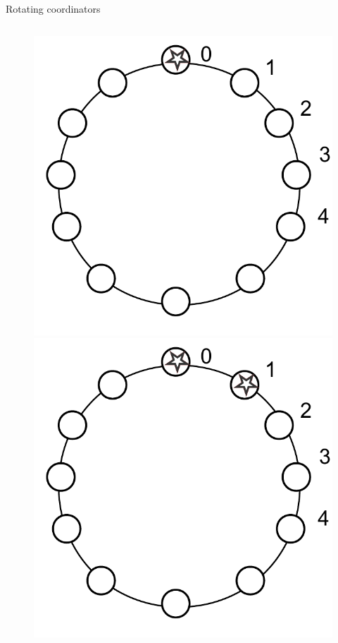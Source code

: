 \begin{frame}{Rotating coordinators}
\begin{columns}
\begin{column}{0.4\textwidth}
\begin{figure}
\begin{overprint}
			\includegraphics[width=\textwidth]{figs/07/rotating1}
			\onslide<3|handout:0>\includegraphics[width=\textwidth]{figs/07/rotating2}

\end{overprint}
\end{figure}
\end{column}
\end{columns}
\end{frame}
